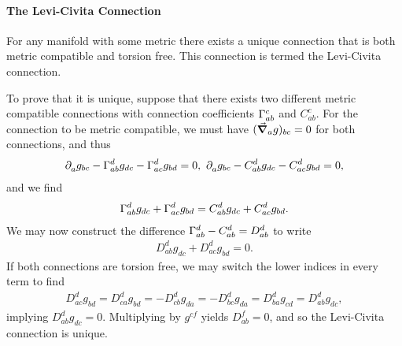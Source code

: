 \paragraph{The Levi-Civita Connection}
For any manifold with some metric there exists a unique connection that is both metric compatible and torsion free. This connection is termed the Levi-Civita connection.

To prove that it is unique, suppose that there exists two different metric compatible connections with connection coefficients $\chris{c}{a}{b}$ and $C^{c}_{ab}$. For the connection to be metric compatible, we must have $(\grad_{a}{g})_{bc} = 0$ for both connections, and thus
\begin{align*}
	\del{}{a}{g_{bc}} - \chris{d}{a}{b}g_{dc} - \chris{d}{a}{c}g_{bd} = 0,\ \del{}{a}{g_{bc}} - C^{d}_{ab}g_{dc} - C^{d}_{ac}g_{bd} = 0,
\end{align*}
and we find
\begin{align*}
	\chris{d}{a}{b}g_{dc} + \chris{d}{a}{c}g_{bd} = C^{d}_{ab}g_{dc} + C^{d}_{ac}g_{bd}.
\end{align*}
We may now construct the difference $\chris{d}{a}{b} - C^{d}_{ab} = D^{d}_{ab}$ to write
\begin{align*}
	D^{d}_{ab}g_{dc} + D^{d}_{ac}g_{bd} = 0.
\end{align*}
If both connections are torsion free, we may switch the lower indices in every term to find
\begin{align*}
	D^{d}_{ac}g_{bd} = D^{d}_{ca}g_{bd} = -D^{d}_{cb}g_{da} = -D^{d}_{bc}g_{da} = D^{d}_{ba}g_{cd} = D^{d}_{ab}g_{dc},
\end{align*}
implying $D^{d}_{ab}g_{dc} = 0$. Multiplying by $g^{cf}$ yields $D^{f}_{ab} = 0$, and so the Levi-Civita connection is unique.

